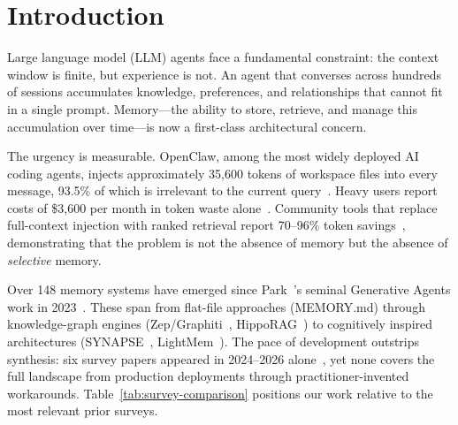 \section{Introduction}
\label{sec:introduction}

Large language model (LLM) agents face a fundamental constraint: the
context window is finite, but experience is not. An agent that
converses across hundreds of sessions accumulates knowledge,
preferences, and relationships that cannot fit in a single prompt.
Memory---the ability to store, retrieve, and manage this accumulation
over time---is now a first-class architectural concern.

The urgency is measurable. OpenClaw, among the most widely deployed AI coding
agents, injects approximately 35,600 tokens of workspace files into
every message, 93.5\% of which is irrelevant to the current
query~\cite{openclaw9157}. Heavy users report costs of \$3,600 per
month in token waste alone~\cite{zilliz2026b}. Community tools that
replace full-context injection with ranked retrieval report 70--96\%
token savings~\cite{levine2026}, demonstrating that the problem is not
the absence of memory but the absence of \emph{selective} memory.

Over 148 memory systems have emerged since Park~\etal's seminal
Generative Agents work in 2023~\cite{park2023generative}. These span
from flat-file approaches (MEMORY.md) through knowledge-graph engines
(Zep/Graphiti~\cite{dempsey2025graphiti},
HippoRAG~\cite{gutierrez2024hipporag}) to cognitively inspired
architectures (SYNAPSE~\cite{jiang2026synapse},
LightMem~\cite{fang2025lightmem}). The pace of development outstrips
synthesis: six survey papers appeared in 2024--2026
alone~\cite{sumers2024coala, gao2023rag, zhang2024survey, hu2025memory,
wu2025memory, du2025memory}, yet none covers the full landscape from
production deployments through practitioner-invented workarounds.
Table~\ref{tab:survey-comparison} positions our work relative to the most
relevant prior surveys.

